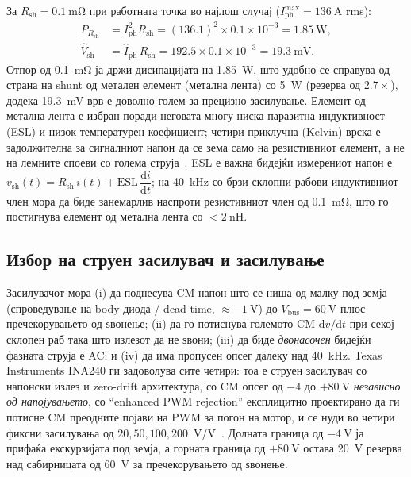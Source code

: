 \documentclass[journal,onecolumn,11pt]{IEEEtran}
\newcommand{\Vdcbus}{V_{\mathrm{bus}}}
\newcommand{\Rshunt}{R_{\mathrm{sh}}}
\newcommand{\Iphrms}{I_{\mathrm{ph}}}
\begin{document}
За $\Rshunt=\SI{0.1}{\milli\ohm}$ при работната точка во најлош случај
($\Iphrms^{\max}=\SI{136}{\ampere}$ rms):
\begin{align}
P_{\Rshunt} &= \Iphrms^{2}\Rshunt = (136.1)^2\times 0.1\times10^{-3} = \SI{1.85}{\watt},\\
\hat V_{\mathrm{sh}} &= \hat I_{\mathrm{ph}}\,\Rshunt = 192.5\times 0.1\times10^{-3} = \SI{19.3}{\milli\volt}.
\end{align}
Отпор од \SI{0.1}{\milli\ohm} ја држи дисипацијата на \SI{1.85}{\watt}, што удобно се справува од
страна на shunt од метален елемент (метална лента) со \SI{5}{\watt} (резерва од $2.7\times$), додека
\SI{19.3}{\milli\volt} врв е доволно голем за прецизно засилување. Елемент од метална лента е избран
поради неговата многу ниска паразитна индуктивност (ESL) и низок температурен коефициент;
четири-приклучна (Kelvin) врска е задолжителна за сигналниот напон да се зема само на резистивниот
елемент, а не на лемните споеви со голема струја~\cite{ina240ds}. ESL е важна бидејќи измерениот
напон е $v_{\mathrm{sh}}(t)=\Rshunt\,i(t)+\mathrm{ESL}\,\dfrac{\mathrm{d}i}{\mathrm{d}t}$; на
\SI{40}{\kilo\hertz} со брзи склопни рабови индуктивниот член мора да биде занемарлив наспроти
резистивниот член од \SI{0.1}{\milli\ohm}, што го постигнува елемент од метална лента со
$<\SI{2}{\nano\henry}$.

\subsection{Избор на струен засилувач и засилување}\label{sec:csa}
Засилувачот мора (i) да поднесува CM напон што се ниша од малку под земја (спроведување на body-диода
/ dead-time, $\approx\SI{-1}{\volt}$) до $\Vdcbus=\SI{60}{\volt}$ плюс пречекорувањето од ѕвонење;
(ii) да го потиснува големото CM $\mathrm{d}v/\mathrm{d}t$ при секој склопен раб така што излезот да
не ѕвони; (iii) да биде \emph{двонасочен} бидејќи фазната струја е AC; и (iv) да има пропусен опсег
далеку над \SI{40}{\kilo\hertz}. Texas Instruments INA240 ги задоволува сите четири: тоа е струен
засилувач со напонски излез и zero-drift архитектура, со CM опсег од $-4$ до $+\SI{80}{\volt}$
\emph{независно од напојувањето}, со ``enhanced PWM rejection'' експлицитно проектирано да ги потисне
CM преодните појави на PWM за погон на мотор, и се нуди во четири фиксни засилувања од
$20,50,100,200$~V/V~\cite{ina240ds}. Долната граница од $-\SI{4}{\volt}$ ја прифаќа екскурзијата под
земја, а горната граница од $+\SI{80}{\volt}$ остава \SI{20}{\volt} резерва над сабирницата од
\SI{60}{\volt} за пречекорувањето од ѕвонење.
\end{document}
